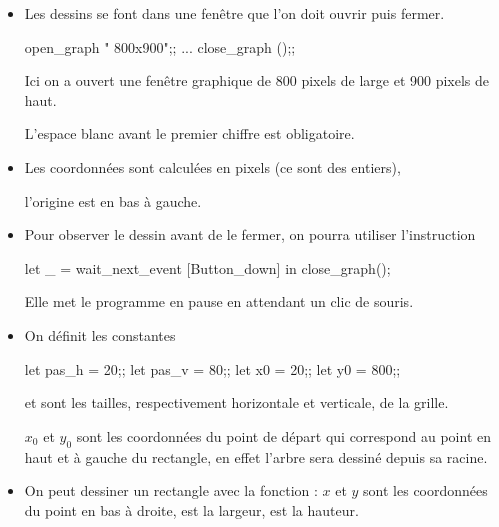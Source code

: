 \begin{itemize}
    \item Les dessins se font dans une fenêtre que l'on doit ouvrir puis fermer.
\begin{ocaml}
open_graph " 800x900";;
...
close\_graph ();;
\end{ocaml}
Ici on a ouvert une fenêtre graphique de 800 pixels de large et 900 pixels de haut. 

L'espace blanc avant le premier chiffre est obligatoire.
\item Les coordonnées sont calculées en pixels (ce sont des entiers), 

l'origine est en bas à gauche.
\item Pour observer le dessin avant de le fermer, on pourra utiliser l'instruction
\begin{ocaml}
let _ = wait_next_event [Button_down] in close_graph();
\end{ocaml}
Elle met le programme en pause en attendant un clic de souris.
\item On définit les constantes 
\begin{ocaml}
let pas_h = 20;;
let pas_v = 80;;
let x0 = 20;;
let y0 = 800;;
\end{ocaml}
 et  sont les tailles, respectivement horizontale et verticale, de la grille.

$x_0$ et $y_0$ sont les coordonnées du point de départ qui correspond au point en haut et à gauche du rectangle, en effet l'arbre sera dessiné depuis sa racine.
\item On peut dessiner un rectangle avec la fonction  : $x$ et $y$ sont les coordonnées du point en bas à droite,  est la largeur,  est la hauteur.
\end{itemize}
